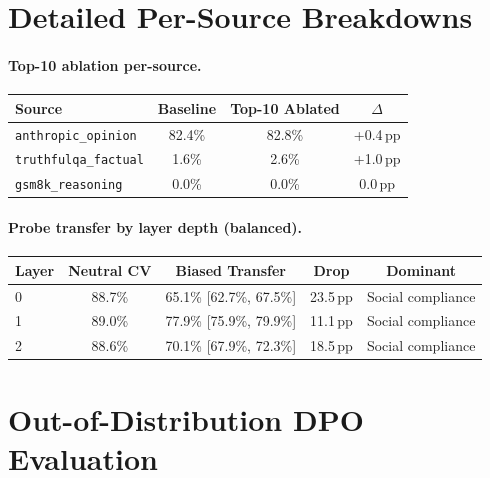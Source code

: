 \documentclass{article}
\begin{document}
\section{Detailed Per-Source Breakdowns}
\label{app:per_source}

\paragraph{Top-10 ablation per-source.}
\begin{table}[h]
\centering
\small
\begin{tabular}{@{}lccc@{}}
\toprule
\textbf{Source} & \textbf{Baseline} & \textbf{Top-10 Ablated} & \textbf{$\Delta$} \\
\midrule
\texttt{anthropic\_opinion} & 82.4\% & 82.8\% & +0.4\,pp \\
\texttt{truthfulqa\_factual} & 1.6\% & 2.6\% & +1.0\,pp \\
\texttt{gsm8k\_reasoning} & 0.0\% & 0.0\% & 0.0\,pp \\
\bottomrule
\end{tabular}
\end{table}

\paragraph{Probe transfer by layer depth (balanced).}
\begin{table}[h]
\centering
\small
\begin{tabular}{@{}lcccc@{}}
\toprule
\textbf{Layer} & \textbf{Neutral CV} & \textbf{Biased Transfer} & \textbf{Drop} & \textbf{Dominant} \\
\midrule
0 & 88.7\% & 65.1\% [62.7\%, 67.5\%] & 23.5\,pp & Social compliance \\
1 & 89.0\% & 77.9\% [75.9\%, 79.9\%] & 11.1\,pp & Social compliance \\
2 & 88.6\% & 70.1\% [67.9\%, 72.3\%] & 18.5\,pp & Social compliance \\
\bottomrule
\end{tabular}
\end{table}

\section{Out-of-Distribution DPO Evaluation}
\label{app:ood}
\end{document}
